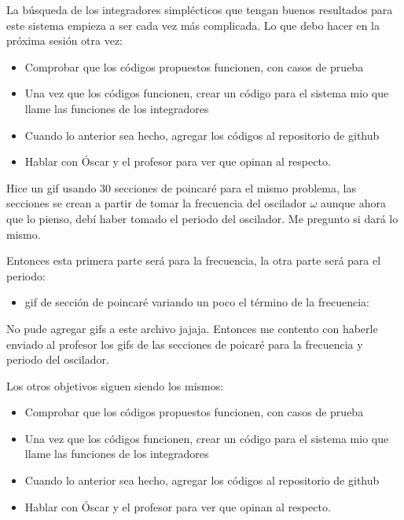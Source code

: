 \documentclass[idxtotoc,hyperref,openany]{labbook} %
\begin{document}
La búsqueda de los integradores simplécticos que tengan buenos resultados para este sistema empieza a ser cada vez más complicada.
Lo que debo hacer en la próxima sesión otra vez:
\begin{itemize}
\item Comprobar que los códigos propuestos funcionen, con casos de prueba
\item Una vez que los códigos funcionen, crear un código para el sistema mio que llame las funciones de los integradores
\item Cuando lo anterior sea hecho, agregar los códigos al repositorio de github
\item Hablar con Óscar y el profesor para ver que opinan al respecto.
\end{itemize}


Hice un gif usando 30 secciones de poincaré para el mismo problema, las secciones se crean a partir de tomar la frecuencia del oscilador $\omega$ aunque ahora que lo pienso, debí haber tomado el periodo del oscilador. Me pregunto si dará lo mismo.\par

Entonces esta primera parte será para la frecuencia, la otra parte será para el periodo:
\begin{itemize}
\item gif de sección de poincaré variando un poco el término de la frecuencia:


\end{itemize}
No pude agregar gifs a este archivo jajaja. Entonces me contento con haberle enviado al profesor los gifs de las secciones de poicaré para la frecuencia y periodo del oscilador.

Los otros objetivos siguen siendo los mismos:

\begin{itemize}
\item Comprobar que los códigos propuestos funcionen, con casos de prueba
\item Una vez que los códigos funcionen, crear un código para el sistema mio que llame las funciones de los integradores
\item Cuando lo anterior sea hecho, agregar los códigos al repositorio de github
\item Hablar con Óscar y el profesor para ver que opinan al respecto.
\end{itemize}
\end{document}
